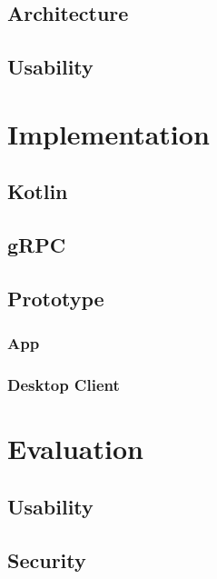 \documentclass[12pt,oneside,a4paper,parskip]{scrbook}
\begin{document}
\section{Architecture}

\section{Usability}

\chapter{Implementation}

\section{Kotlin}

\section{gRPC}

\section{Prototype}

\subsection{App}

\subsection{Desktop Client}



\chapter{Evaluation}

\section{Usability}

\section{Security}

\end{document}
